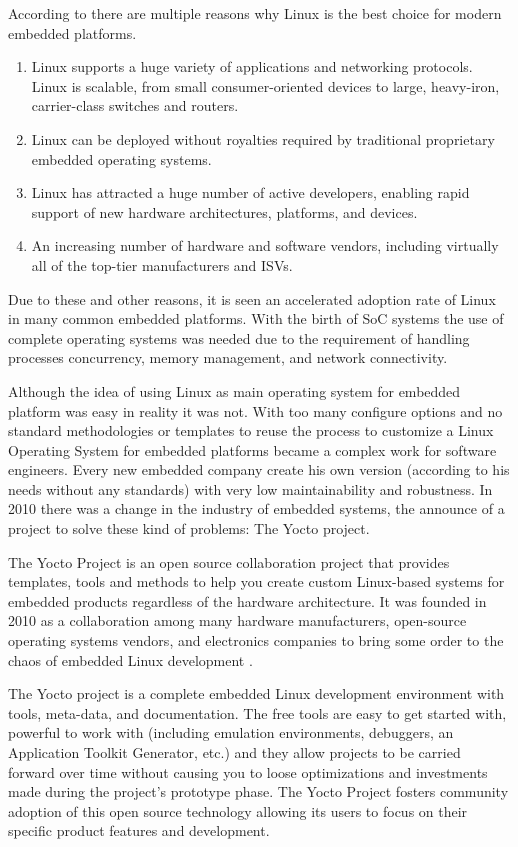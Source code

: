 According to \cite{Hallinan} there are multiple reasons why Linux is the best
choice for modern embedded platforms.

\begin{enumerate}
\item Linux supports a huge variety of applications and networking protocols.
Linux is scalable, from small consumer-oriented devices to large, heavy-iron,
carrier-class switches and routers.
\item Linux can be deployed without royalties required by traditional proprietary
embedded operating systems.
\item Linux has attracted a huge number of active developers, enabling rapid support
of new hardware architectures, platforms, and devices.
\item An increasing number of hardware and software vendors, including virtually all
of the top-tier manufacturers and ISVs.
\end{enumerate}

Due to these and other reasons, it is seen an accelerated adoption rate of
Linux in many common embedded platforms. With the birth of SoC systems the
use of complete operating systems was needed due to the requirement of handling
processes concurrency, memory management, and network connectivity.

Although the idea of using Linux as main operating system for embedded platform
was easy in reality it was not. With too many configure options and no standard
methodologies or templates to reuse the process to customize a Linux Operating
System for embedded platforms became a complex work for software engineers.
Every new embedded company create his own version (according to his needs
without any standards) with very low maintainability and robustness. In 2010
there was a change in the industry of embedded systems, the announce of a
project to solve these kind of problems: The Yocto project.

The Yocto Project is an open source collaboration project that provides
templates, tools and methods to help you create custom Linux-based systems for
embedded products regardless of the hardware architecture\cite{yocto-project}.
It was founded in 2010 as a collaboration among many hardware manufacturers,
open-source operating systems vendors, and electronics companies to bring some
order to the chaos of embedded Linux development \cite{Leppakoski}.

The Yocto project  is a  complete embedded Linux development environment with
tools, meta-data, and documentation. The free tools are easy to get started
with, powerful to work with (including emulation environments, debuggers, an
Application Toolkit Generator, etc.) and they allow projects to be carried
forward over time without causing you to loose optimizations and investments
made during the project's prototype phase. The Yocto Project fosters community
adoption of this open source technology allowing its users to focus on their
specific product features and development.


